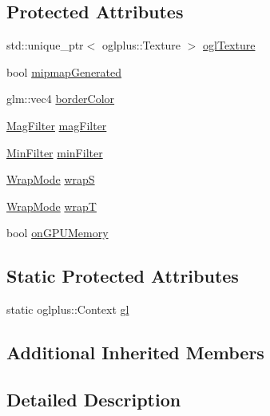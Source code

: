 \subsection*{Protected Attributes}
\begin{DoxyCompactItemize}
\item 
std\+::unique\+\_\+ptr$<$ oglplus\+::\+Texture $>$ \hyperlink{class_o_g_l_texture2_d_a81c34266417bac598a6dcf78655e3657}{ogl\+Texture}
\item 
bool \hyperlink{class_o_g_l_texture2_d_ad0f35d77499d646cee162e9a3213c243}{mipmap\+Generated}
\item 
glm\+::vec4 \hyperlink{class_o_g_l_texture2_d_ab49fd4b19ab6b299d99c128b90861e9d}{border\+Color}
\item 
\hyperlink{class_o_g_l_texture2_d_ad72001307eaec4898b25c749c1857f25}{Mag\+Filter} \hyperlink{class_o_g_l_texture2_d_abcc4f2fdc77667a1ff83d0f23b94fbdd}{mag\+Filter}
\item 
\hyperlink{class_o_g_l_texture2_d_a853053ed9bf1c5e1024f947303cb0ec3}{Min\+Filter} \hyperlink{class_o_g_l_texture2_d_a064aa8eb5f6a5bc10300c0a68fd95c10}{min\+Filter}
\item 
\hyperlink{class_o_g_l_texture2_d_ac6dae14737ed8643d30026dceebd10cc}{Wrap\+Mode} \hyperlink{class_o_g_l_texture2_d_a9ce6cda4bc4c3149447c20017c35efd8}{wrap\+S}
\item 
\hyperlink{class_o_g_l_texture2_d_ac6dae14737ed8643d30026dceebd10cc}{Wrap\+Mode} \hyperlink{class_o_g_l_texture2_d_a66d477be8c69a34eb6dc5660926bf28f}{wrap\+T}
\item 
bool \hyperlink{class_o_g_l_texture2_d_a986498afd6ef99ef2bfc05b62a4c5b8b}{on\+G\+P\+U\+Memory}
\end{DoxyCompactItemize}
\subsection*{Static Protected Attributes}
\begin{DoxyCompactItemize}
\item 
static oglplus\+::\+Context \hyperlink{class_o_g_l_texture2_d_a53d4b615b88288938afb52730022d6a8}{gl}
\end{DoxyCompactItemize}
\subsection*{Additional Inherited Members}


\subsection{Detailed Description}


